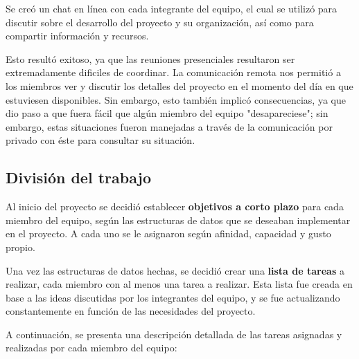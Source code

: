 \documentclass[9pt,letterpaper,onecolumn]{rho-class/rho}
\begin{document}
    Se creó un chat en línea con cada integrante del equipo, el cual se utilizó para discutir sobre el desarrollo del proyecto y su organización, así como para compartir información y recursos.

    \vspace{0.5cm}

    Esto resultó exitoso, ya que las reuniones presenciales resultaron ser extremadamente dificiles de coordinar. La comunicación remota nos permitió a los miembros ver y discutir los detalles del proyecto en el momento del día en que estuviesen disponibles. Sin embargo, esto también implicó consecuencias, ya que dio paso a que fuera fácil que algún miembro del equipo "desapareciese"; sin embargo, estas situaciones fueron manejadas a través de la comunicación por privado con éste para consultar su situación.

    \subsection{División del trabajo}

    Al inicio del proyecto se decidió establecer \textbf{objetivos a corto plazo} para cada miembro del equipo, según las estructuras de datos que se deseaban implementar en el proyecto. A cada uno se le asignaron según afinidad, capacidad y gusto propio.

    \vspace{0.5cm}

    Una vez las estructuras de datos hechas, se decidió crear una \textbf{lista de tareas} a realizar, cada miembro con al menos una tarea a realizar. Esta lista fue creada en base a las ideas discutidas por los integrantes del equipo, y se fue actualizando constantemente en función de las necesidades del proyecto.

    A continuación, se presenta una descripción detallada de las tareas asignadas y realizadas por cada miembro del equipo:
    
\end{document}
